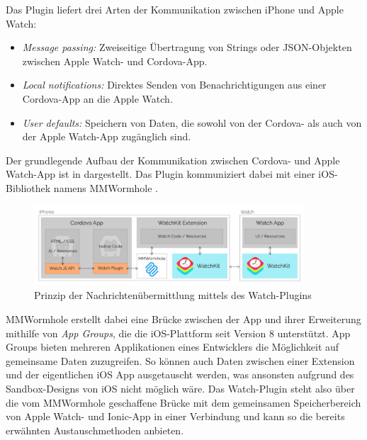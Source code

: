 Das Plugin liefert drei Arten der Kommunikation zwischen iPhone und Apple Watch:
\begin{itemize}
    \item \emph{Message passing:} Zweiseitige Übertragung von Strings oder JSON-Objekten zwischen Apple Watch- und Cordova-App.
    \item \emph{Local notifications:} Direktes Senden von Benachrichtigungen aus einer Cordova-App an die Apple Watch.
    \item \emph{User defaults:} Speichern von Daten, die sowohl von der Cordova- als auch von der Apple Watch-App zugänglich sind.
\end{itemize}
%
Der grundlegende Aufbau der Kommunikation zwischen Cordova- und Apple Watch-App ist in  dargestellt. Das Plugin kommuniziert dabei mit einer iOS-Bibliothek namens MMWormhole \cite{gitMMWormhole}.
%
\begin{figure}[!htb] 
	\centering
	\includegraphics[width=0.9\textwidth]{data/bilder/apple-watch-plugin.png}
	\caption{Prinzip der Nachrichtenübermittlung mittels des Watch-Plugins \cite{CrossleyCordovaAppleWatchPlugin}}
	\label{fig:watchPlugin}
\end{figure}
%
MMWormhole erstellt dabei eine Brücke zwischen der App und ihrer Erweiterung mithilfe von \emph{App Groups}, die die iOS-Plattform seit Version 8 unterstützt. App Groups bieten mehreren Applikationen eines Entwicklers die Möglichkeit auf gemeinsame Daten zuzugreifen. So können auch Daten zwischen einer Extension und der eigentlichen iOS App ausgetauscht werden, was ansonsten aufgrund des Sandbox-Designs von iOS nicht möglich wäre. Das Watch-Plugin steht also über die vom MMWormhole geschaffene Brücke mit dem gemeinsamen Speicherbereich von Apple Watch- und Ionic-App in einer Verbindung und kann so die bereits erwähnten Austauschmethoden anbieten.
%
%

